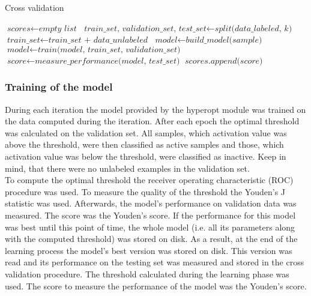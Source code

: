 \documentclass[a4paper,10pt]{report}
\begin{document}
	\begin{algorithm}
	\caption{Cross validation}\label{alg:cross_validation}
	\begin{algorithmic}[1]
	\State
	\State $\textit{scores} \gets \textit{empty list}$
	\State
	  \State $\textit{train\_set, validation\_set, test\_set} \gets \textit{split(data\_labeled, k)} $
	  \State $\textit{train\_set} \gets \textit{train\_set + data\_unlabeled}$
	  \State $\textit{model} \gets \textit{build\_model(sample)}$
	  \State $\textit{model} \gets \textit{train(model, train\_set, validation\_set)}$
	  \State $\textit{score} \gets \textit{measure\_performance(model, test\_set)}$
	  \State $\textit{scores.append(score)}$
	\EndFor
	\State       
	\State
	\EndProcedure
	\end{algorithmic}
	\end{algorithm}
	
	\subsubsection{Training of the model}
	During each iteration the model provided by the hyperopt module was trained on the data computed during the iteration. After each epoch the optimal threshold was calculated on the validation set. All samples, which activation value was above the threshold, were then classified as active samples and those, which activation value was below the threshold, were classified as inactive. Keep in mind, that there were no unlabeled examples in the validation set.\\
	
	To compute the optimal threshold the receiver operating characteristic (ROC) procedure was used. To measure the quality of the threshold the Youden's J statistic was used. Afterwards, the model's performance on validation data was measured. The score was the Youden's score. If the performance for this model was best until this point of time, the whole model (i.e. all its parameters along with the computed threshold) was stored on disk. As a result, at the end of the learning process the model's best version was stored on disk. This version was read and its performance on the testing set was measured and stored in the cross validation procedure. The threshold calculated during the learning phase was used. The score to measure the performance of the model was the Youden's score.\\
	
\end{document}
